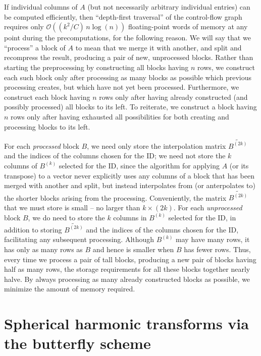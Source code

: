 \documentclass[final,3p,times]{elsarticle}
\def\bigoh{\mathcal{O}}
\begin{document}
If individual columns of $A$
(but not necessarily arbitrary individual entries) can be computed efficiently,
then ``depth-first traversal'' of the control-flow graph
requires only $\bigoh((k^2/C) \, n \log(n))$ floating-point words of memory
at any point during the precomputations, for the following reason.
We will say that we ``process'' a block of $A$ to mean that we merge it
with another, and split and recompress the result,
producing a pair of new, unprocessed blocks.
Rather than starting the preprocessing by constructing all blocks
having $n$ rows, we construct each such block only after processing
as many blocks as possible which previous processing creates,
but which have not yet been processed.
Furthermore, we construct each block having $n$ rows only after having already
constructed (and possibly processed) all blocks to its left.
To reiterate, we construct a block having $n$ rows only after having exhausted
all possibilities for both creating and processing blocks to its left.

For each {\it processed} block $B$, we need only store the interpolation matrix
$\widetilde{B^{(2k)}}$ and the indices of the columns chosen for the ID;
we need not store the $k$ columns of $B^{(k)}$ selected for the ID,
since the algorithm for applying $A$ (or its transpose) to a vector
never explicitly uses any columns of a block that has been merged
with another and split, but instead interpolates from (or anterpolates to)
the shorter blocks arising from the processing.
Conveniently, the matrix $\widetilde{B^{(2k)}}$ that we must store is small
-- no larger than $k \times (2k)$.
For each {\it unprocessed} block $B$, we do need to store the $k$ columns
in $B^{(k)}$ selected for the ID, in addition to storing $\widetilde{B^{(2k)}}$
and the indices of the columns chosen for the ID,
facilitating any subsequent processing.
Although $B^{(k)}$ may have many rows, it has only as many rows as $B$
and hence is smaller when $B$ has fewer rows.
Thus, every time we process a pair of tall blocks, producing a new pair
of blocks having half as many rows,
the storage requirements for all these blocks together nearly halve.
By always processing as many already constructed blocks as possible,
we minimize the amount of memory required.



\section{Spherical harmonic transforms via the butterfly scheme}
\label{spharmonics}
\end{document}
